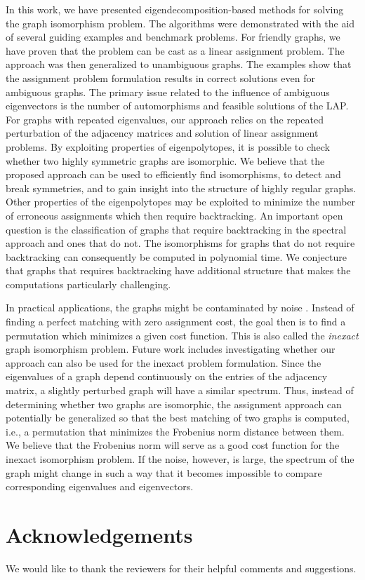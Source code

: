 \documentclass
[
    a4paper,
    DIV=11,
    abstracton
]
{scrartcl}
\theoremstyle{definition}
\begin{document}
In this work, we have presented eigendecomposition-based methods for solving the graph isomorphism problem. The algorithms were demonstrated with the aid of several guiding examples and benchmark problems. For friendly graphs, we have proven that the problem can be cast as a linear assignment problem. The approach was then generalized to unambiguous graphs. The examples show that the assignment problem formulation results in correct solutions even for ambiguous graphs. The primary issue related to the influence of ambiguous eigenvectors is the number of automorphisms and feasible solutions of the LAP. For graphs with repeated eigenvalues, our approach relies on the repeated perturbation of the adjacency matrices and solution of linear assignment problems. By exploiting properties of eigenpolytopes, it is possible to check whether two highly symmetric graphs are isomorphic. We believe that the proposed approach can be used to efficiently find isomorphisms, to detect and break symmetries, and to gain insight into the structure of highly regular graphs. Other properties of the eigenpolytopes may be exploited to minimize the number of erroneous assignments which then require backtracking. An important open question is the classification of graphs that require backtracking in the spectral approach and ones that do not. The isomorphisms for graphs that do not require backtracking can consequently be computed in polynomial time. We conjecture that graphs that requires backtracking have additional structure that makes the computations particularly challenging.

In practical applications, the graphs might be contaminated by noise \cite{ABK15}. Instead of finding a perfect matching with zero assignment cost, the goal then is to find a permutation which minimizes a given cost function. This is also called the \emph{inexact} graph isomorphism problem. Future work includes investigating whether our approach can also be used for the inexact problem formulation. Since the eigenvalues of a graph depend continuously on the entries of the adjacency matrix, a slightly perturbed graph will have a similar spectrum. Thus, instead of determining whether two graphs are isomorphic, the assignment approach can potentially be generalized so that the best matching of two graphs is computed, i.e., a permutation that minimizes the Frobenius norm distance between them. We believe that the Frobenius norm will serve as a good cost function for the inexact isomorphism problem. If the noise, however, is large, the spectrum of the graph might change in such a way that it becomes impossible to compare corresponding eigenvalues and eigenvectors.

\section*{Acknowledgements}

We would like to thank the reviewers for their helpful comments and suggestions.



\end{document}
